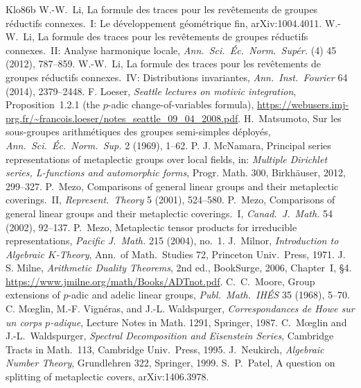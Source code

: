 \begin{thebibliography}{Klo86b}
 W.-W.~Li, La formule des traces pour les rev\^etements de groupes r\'eductifs connexes.\ I: Le d\'eveloppement g\'eom\'etrique fin, arXiv:1004.4011.
 W.-W.~Li, La formule des traces pour les rev\^etements de groupes r\'eductifs connexes.\ II: Analyse harmonique locale, \emph{Ann.\ Sci.\ \'Ec.\ Norm.\ Sup\'er.} (4) 45 (2012), 787--859.
 W.-W.~Li, La formule des traces pour les rev\^etements de groupes r\'eductifs connexes.\ IV: Distributions invariantes, \emph{Ann.\ Inst.\ Fourier} 64 (2014), 2379--2448.
 F. Loeser, \emph{Seattle lectures on motivic integration}, Proposition~1.2.1 (the $p$-adic change-of-variables formula), \url{https://webusers.imj-prg.fr/~francois.loeser/notes_seattle_09_04_2008.pdf}.
 H.~Matsumoto, Sur les sous-groupes arithm\'etiques des groupes semi-simples d\'eploy\'es, \emph{Ann.\ Sci.\ \'Ec.\ Norm.\ Sup.} 2 (1969), 1--62.
 P. J. McNamara, Principal series representations of metaplectic groups over local fields, in: \emph{Multiple Dirichlet series, L-functions and automorphic forms}, Progr. Math. 300, Birkh\"auser, 2012, 299--327.
 P.~Mezo, Comparisons of general linear groups and their metaplectic coverings.\ II, \emph{Represent.\ Theory} 5 (2001), 524--580.
 P.~Mezo, Comparisons of general linear groups and their metaplectic coverings.\ I, \emph{Canad.\ J.\ Math.} 54 (2002), 92--137.
 P.~Mezo, Metaplectic tensor products for irreducible representations, \emph{Pacific J.\ Math.} 215 (2004), no.~1.
 J.~Milnor, \emph{Introduction to Algebraic $K$-Theory}, Ann.\ of Math.\ Studies 72, Princeton Univ.\ Press, 1971.
 J. S. Milne, \emph{Arithmetic Duality Theorems}, 2nd ed., BookSurge, 2006, Chapter~I, \S4. \url{https://www.jmilne.org/math/Books/ADTnot.pdf}.
 C.~C.~Moore, Group extensions of $p$-adic and adelic linear groups, \emph{Publ.\ Math.\ IH\'ES} 35 (1968), 5--70.
 C. M\oe glin, M.-F. Vign\'eras, and J.-L. Waldspurger, \emph{Correspondances de Howe sur un corps $p$-adique}, Lecture Notes in Math. 1291, Springer, 1987.
 C.~M\oe glin and J.-L.~Waldspurger, \emph{Spectral Decomposition and Eisenstein Series}, Cambridge Tracts in Math.\ 113, Cambridge Univ.\ Press, 1995.
 J.~Neukirch, \emph{Algebraic Number Theory}, Grundlehren 322, Springer, 1999.
 S.~P.~Patel, A question on splitting of metaplectic covers, arXiv:1406.3978.

\end{thebibliography}
